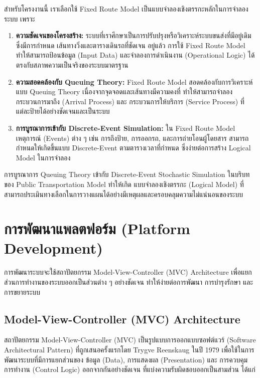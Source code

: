 \begin{mypara}
    \indent สำหรับโครงงานนี้ เราเลือกใช้ Fixed Route Model เป็นแบบจำลองเชิงตรรกะหลักในการจำลองระบบ เพราะ 
    \begin{enumerate}
        \item \textbf{ความชัดเจนของโครงสร้าง:} ระบบที่เราศึกษาเป็นการปรับปรุงหรือวิเคราะห์ระบบขนส่งที่มีอยู่เดิม ซึ่งมีการกำหนด เส้นทางวิ่งและตารางเดินรถที่ชัดเจน อยู่แล้ว การใช้ Fixed Route Model ทำให้สามารถป้อนข้อมูล (Input Data) และจำลองการดำเนินงาน (Operational Logic) ได้ตรงกับสภาพความเป็นจริงของระบบมาตรฐาน
        \item \textbf{ความสอดคล้องกับ Queuing Theory:} Fixed Route Model สอดคล้องกับการวิเคราะห์แบบ Queuing Theory เนื่องจากจุดจอดและเส้นทางมีความคงที่ ทำให้สามารถจำลอง กระบวนการมาถึง (Arrival Process) และ กระบวนการให้บริการ (Service Process) ที่แต่ละป้ายได้อย่างชัดเจนและเป็นระบบ
        \item \textbf{การบูรณาการเข้ากับ Discrete-Event Simulation:} ใน Fixed Route Model เหตุการณ์ (Events) ต่าง ๆ เช่น การถึงป้าย, การออกรถ, และการถ่ายโอนผู้โดยสาร สามารถกำหนดให้เกิดขึ้นแบบ Discrete-Event ตามตารางเวลาที่กำหนด ซึ่งง่ายต่อการสร้าง Logical Model ในการจำลอง
    \end{enumerate}
\end{mypara}

\begin{mypara}
การบูรณาการ Queuing Theory เข้ากับ Discrete-Event Stochastic Simulation ในบริบทของ Public Transportation Model ทำให้เกิด แบบจำลองเชิงตรรกะ (Logical Model) ที่สามารถประเมินทางเลือกในการวางแผนได้อย่างมีเหตุผลและครอบคลุมความไม่แน่นอนของระบบ
\end{mypara}

\section{การพัฒนาแพลตฟอร์ม (Platform Development)}
    \begin{mypara}
        \indent การพัฒนาระบบจะใช้สถาปัตยกรรม Model-View-Controller (MVC) Architecture 
        เพื่อแยกส่วนการทำงานของระบบออกเป็นส่วนต่าง ๆ อย่างชัดเจน ทำให้ง่ายต่อการพัฒนา การบำรุงรักษา และการขยายระบบ
    \end{mypara}

\subsection{Model-View-Controller (MVC) Architecture}
\begin{mypara}
    \indent สถาปัตยกรรม Model-View-Controller (MVC) เป็นรูปแบบการออกแบบซอฟต์แวร์ (Software Architectural Pattern) 
    ที่ถูกเสนอครั้งแรกโดย Trygve Reenskaug ในปี 1979 เพื่อใช้ในการพัฒนาระบบที่มีการแยกส่วนของ 
    ข้อมูล (Data), การแสดงผล (Presentation) และ การควบคุมการทำงาน (Control Logic) ออกจากกันอย่างชัดเจน
    ที่แบ่งความรับผิดชอบออกเป็นสามส่วน ได้แก่ 
\end{mypara}


